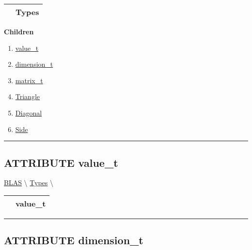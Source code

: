 {\renewcommand{\arraystretch}{1.5}
\begin{tabularx}{\textwidth}{|>{\raggedright\arraybackslash}l|X|}
\hline
\hspace{0pt}\mytexttt{\color{red} } & \textbf{Types} \\
\hline
\end{tabularx}
}

\par


\textbf{Children}
\begin{enumerate}
\item \hyperlink{ecldoc:blas.types.value_t}{value\_t}
\item \hyperlink{ecldoc:blas.types.dimension_t}{dimension\_t}
\item \hyperlink{ecldoc:blas.types.matrix_t}{matrix\_t}
\item \hyperlink{ecldoc:ecldoc-Triangle}{Triangle}
\item \hyperlink{ecldoc:ecldoc-Diagonal}{Diagonal}
\item \hyperlink{ecldoc:ecldoc-Side}{Side}
\end{enumerate}

\rule{\linewidth}{0.5pt}

\subsection*{\textsf{\colorbox{headtoc}{\color{white} ATTRIBUTE}
value\_t}}

\hypertarget{ecldoc:blas.types.value_t}{}
\hspace{0pt} \hyperlink{ecldoc:BLAS}{BLAS} \textbackslash 
\hspace{0pt} \hyperlink{ecldoc:BLAS.Types}{Types} \textbackslash 

{\renewcommand{\arraystretch}{1.5}
\begin{tabularx}{\textwidth}{|>{\raggedright\arraybackslash}l|X|}
\hline
\hspace{0pt}\mytexttt{\color{red} } & \textbf{value\_t} \\
\hline
\end{tabularx}
}

\par


\rule{\linewidth}{0.5pt}
\subsection*{\textsf{\colorbox{headtoc}{\color{white} ATTRIBUTE}
dimension\_t}}

